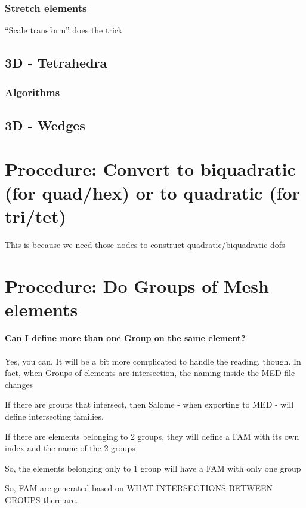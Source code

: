 \documentclass[10pt]{book}
\begin{document}
 
\subsection{Stretch elements}

  ``Scale transform'' does the trick

  \section{3D - Tetrahedra}
  
   \subsection{Algorithms}

  \section{3D - Wedges}
  
  
  \chapter{Procedure: Convert to biquadratic (for quad/hex) or to quadratic (for tri/tet)}
  
  This is because we need those nodes to construct quadratic/biquadratic dofs
  
  
  \chapter{Procedure: Do Groups of Mesh elements}
 

\subsubsection{Can I define more than one Group on the same element?}

 Yes, you can. It will be a bit more complicated to handle the reading, though.
 In fact, when Groups of elements are intersection,
 the naming inside the MED file changes
 
 If there are groups that intersect, then Salome - when exporting to MED - 
 will define intersecting families. 
 
 If there are elements belonging to 2 groups,
 they will define a FAM with its own index and the name of the 2 groups
 
 So, the elements belonging only to 1 group will have a FAM with only one group
 
 So, FAM are generated based on WHAT INTERSECTIONS BETWEEN GROUPS there are.
 
\end{document}
